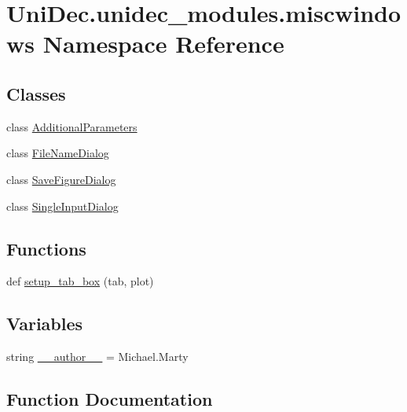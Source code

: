 \hypertarget{namespace_uni_dec_1_1unidec__modules_1_1miscwindows}{}\section{Uni\+Dec.\+unidec\+\_\+modules.\+miscwindows Namespace Reference}
\label{namespace_uni_dec_1_1unidec__modules_1_1miscwindows}
\subsection*{Classes}
\begin{DoxyCompactItemize}
\item 
class \hyperlink{class_uni_dec_1_1unidec__modules_1_1miscwindows_1_1_additional_parameters}{Additional\+Parameters}
\item 
class \hyperlink{class_uni_dec_1_1unidec__modules_1_1miscwindows_1_1_file_name_dialog}{File\+Name\+Dialog}
\item 
class \hyperlink{class_uni_dec_1_1unidec__modules_1_1miscwindows_1_1_save_figure_dialog}{Save\+Figure\+Dialog}
\item 
class \hyperlink{class_uni_dec_1_1unidec__modules_1_1miscwindows_1_1_single_input_dialog}{Single\+Input\+Dialog}
\end{DoxyCompactItemize}
\subsection*{Functions}
\begin{DoxyCompactItemize}
\item 
def \hyperlink{namespace_uni_dec_1_1unidec__modules_1_1miscwindows_a2302760926d9a82cd4e3d1689388a9c2}{setup\+\_\+tab\+\_\+box} (tab, plot)
\end{DoxyCompactItemize}
\subsection*{Variables}
\begin{DoxyCompactItemize}
\item 
string \hyperlink{namespace_uni_dec_1_1unidec__modules_1_1miscwindows_a107f0b794e69f3a8efc7929a8cda9d5d}{\+\_\+\+\_\+author\+\_\+\+\_\+} = \textquotesingle{}Michael.\+Marty\textquotesingle{}
\end{DoxyCompactItemize}


\subsection{Function Documentation}
\hypertarget{namespace_uni_dec_1_1unidec__modules_1_1miscwindows_a2302760926d9a82cd4e3d1689388a9c2}{}
